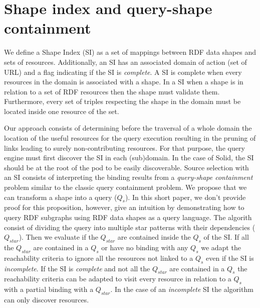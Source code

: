 \section{Shape index and query-shape containment}

We define a Shape Index (SI) as a set of mappings between RDF data shapes and sets of resources.
Additionally, an SI has an associated domain of action (set of URL)
and a flag indicating if the SI is \emph{complete}.
A SI is complete when every resources in the domain is associated with a shape.
In a SI when a shape is in relation to a set of RDF resources then the shape must validate them.
Furthermore, every set of triples respecting the shape in the domain must be located inside one resource of the set.

Our approach consists of determining before the traversal of a whole domain the location of the useful resources for the query execution
resulting in the pruning of links leading to surely non-contributing resources.
For that purpose, the query engine must first discover the SI in each (sub)domain.
In the case of Solid, the SI should be at the root of the pod to be easily discoverable.
Source selection with an SI consists of interpreting the binding results from a \emph{query-shape containment} problem similar to the classic query containment problem.
We propose that we can transform a shape into a query ($Q_{s}$).
In this short paper, we don't provide proof for this proposition, however, 
\citeauthor{Delva2021} give an intuition by demonstrating how to query RDF subgraphs using RDF data shapes as a query language.
The algorith consist of dividing the query into multiple star patterns with their dependencies ($Q_{star}$).
Then we evaluate if the  $Q_{star}$ are contained inside the $Q_s$ of the SI.
If all the $Q_{star}$ are contained in a $Q_{s}$ or have no binding with any $Q_{s}$
we adapt the reachability criteria to ignore all the resources not linked to a $Q_{s}$ even if the SI is \emph{incomplete}.
If the SI is \emph{complete} and not all the $Q_{star}$ are contained in a $Q_{s}$ the reachability criteria can be adapted
to visit every resource in relation to a $Q_{s}$ with a partial binding with a $Q_{star}$. 
In the case of an \emph{incomplete} SI the algorithm can only discover resources.
